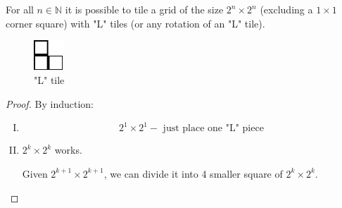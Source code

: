 \documentclass[00_complete]{subfiles}
\begin{document}
\begin{example}
    For all $n \in \mathbb{N}$ it is possible to tile a grid of the size $2^n
    \times 2^n$ (excluding a $1 \times 1$ corner square) with "L" tiles (or any
    rotation of an "L" tile).
\begin{figure}[ht]
  \centering
    \includegraphics[width=0.1\textwidth]{w8_l}
    \caption{"L" tile}
\end{figure}
\begin{proof}
    By induction:
    \begin{enumerate}[I.]
        \item
        \begin{equation}
            2^1 \times 2^1 - \text{ just place one "L" piece}
            \tag{\checkmark}
        \end{equation}
        \item
        $2^k \times 2^k$ works.

        Given $2^{k+1} \times 2^{k+1}$, we can divide it into 4 smaller square
        of $2^k \times 2^k$.
    \end{enumerate}
\end{proof}
\end{example}
\end{document}
